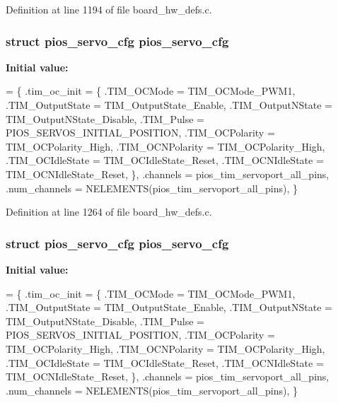 Definition at line 1194 of file board\-\_\-hw\-\_\-defs.\-c.

\hypertarget{group___tau_labs_core_ga57a87ef16d7949a9cc3589efc8d88a28}{
\subsubsection[{pios\-\_\-servo\-\_\-cfg}]{\setlength{\rightskip}{0pt plus 5cm}struct {\bf pios\-\_\-servo\-\_\-cfg} {\bf pios\-\_\-servo\-\_\-cfg}}}\label{group___tau_labs_core_ga57a87ef16d7949a9cc3589efc8d88a28}
{\bfseries Initial value\-:}
\begin{DoxyCode}
= \{
        .tim\_oc\_init = \{
                .TIM\_OCMode = TIM\_OCMode\_PWM1,
                .TIM\_OutputState = TIM\_OutputState\_Enable,
                .TIM\_OutputNState = TIM\_OutputNState\_Disable,
                .TIM\_Pulse = PIOS\_SERVOS\_INITIAL\_POSITION,
                .TIM\_OCPolarity = TIM\_OCPolarity\_High,
                .TIM\_OCNPolarity = TIM\_OCPolarity\_High,
                .TIM\_OCIdleState = TIM\_OCIdleState\_Reset,
                .TIM\_OCNIdleState = TIM\_OCNIdleState\_Reset,
        \},
        .channels = pios\_tim\_servoport\_all\_pins,
        .num\_channels = NELEMENTS(pios\_tim\_servoport\_all\_pins),
\}
\end{DoxyCode}


Definition at line 1264 of file board\-\_\-hw\-\_\-defs.\-c.

\hypertarget{group___tau_labs_core_ga57a87ef16d7949a9cc3589efc8d88a28}{
\subsubsection[{pios\-\_\-servo\-\_\-cfg}]{\setlength{\rightskip}{0pt plus 5cm}struct {\bf pios\-\_\-servo\-\_\-cfg} {\bf pios\-\_\-servo\-\_\-cfg}}}\label{group___tau_labs_core_ga57a87ef16d7949a9cc3589efc8d88a28}
{\bfseries Initial value\-:}
\begin{DoxyCode}
= \{
        .tim\_oc\_init = \{
                .TIM\_OCMode = TIM\_OCMode\_PWM1,
                .TIM\_OutputState = TIM\_OutputState\_Enable,
                .TIM\_OutputNState = TIM\_OutputNState\_Disable,
                .TIM\_Pulse = PIOS\_SERVOS\_INITIAL\_POSITION,
                .TIM\_OCPolarity = TIM\_OCPolarity\_High,
                .TIM\_OCNPolarity = TIM\_OCPolarity\_High,
                .TIM\_OCIdleState = TIM\_OCIdleState\_Reset,
                .TIM\_OCNIdleState = TIM\_OCNIdleState\_Reset,
        \},
        .channels = pios\_tim\_servoport\_all\_pins,
        .num\_channels = NELEMENTS(pios\_tim\_servoport\_all\_pins),
\}
\end{DoxyCode}


